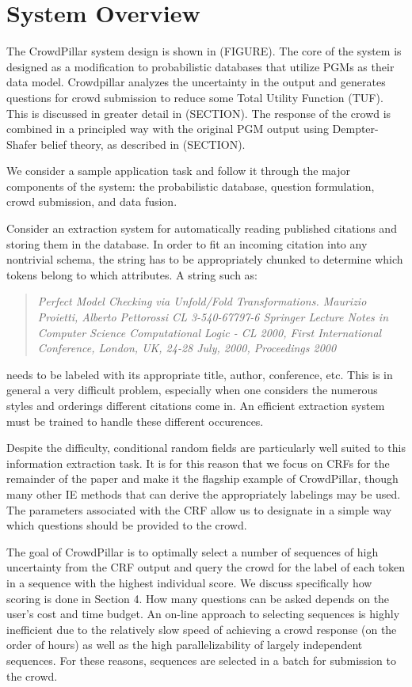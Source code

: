 \section{System Overview}
The CrowdPillar system design is shown in (FIGURE). The core of the system is designed as a modification to probabilistic databases that utilize PGMs as their data model.  Crowdpillar analyzes the uncertainty in the output and generates questions for crowd submission to reduce some Total Utility Function (TUF).  This is discussed in greater detail in (SECTION).  The response of the crowd is combined in a principled way with the original PGM output using Dempter-Shafer belief theory, as described in (SECTION).

We consider a sample application task and follow it through the major components of the system: the probabilistic database, question formulation, crowd submission, and data fusion.

Consider an extraction system for automatically reading published citations and storing them in the database.  In order to fit an incoming citation into any nontrivial schema, the string has to be appropriately chunked to determine which tokens belong to which attributes.  A string such as:
\begin{quotation}
\textit{Perfect Model Checking via Unfold/Fold Transformations. Maurizio Proietti, Alberto Pettorossi CL 3-540-67797-6 Springer Lecture Notes in Computer Science Computational Logic - CL 2000, First International Conference, London, UK, 24-28 July, 2000, Proceedings 2000}
\end{quotation}
needs to be labeled with its appropriate title, author, conference, etc.  This is in general a very difficult problem, especially when one considers the numerous styles and orderings different citations come in.  An efficient extraction system must be trained to handle these different occurences.

Despite the difficulty, conditional random fields are particularly well suited to this information extraction task.  It is for this reason that we focus on CRFs for the remainder of the paper and make it the flagship example of CrowdPillar, though many other IE methods that can derive the appropriately labelings may be used.  The parameters associated with the CRF allow us to designate in a simple way which questions should be provided to the crowd. 

The goal of CrowdPillar is to optimally select a number of sequences of high uncertainty from the CRF output and query the crowd for the label of each token in a sequence with the highest individual score.  We discuss specifically how scoring is done in Section 4.  How many questions can be asked depends on the user's cost and time budget.  An on-line approach to selecting sequences is highly inefficient due to the relatively slow speed of achieving a crowd response (on the order of hours) as well as the high parallelizability of largely independent sequences.  For these reasons, sequences are selected in a batch for submission to the crowd.

